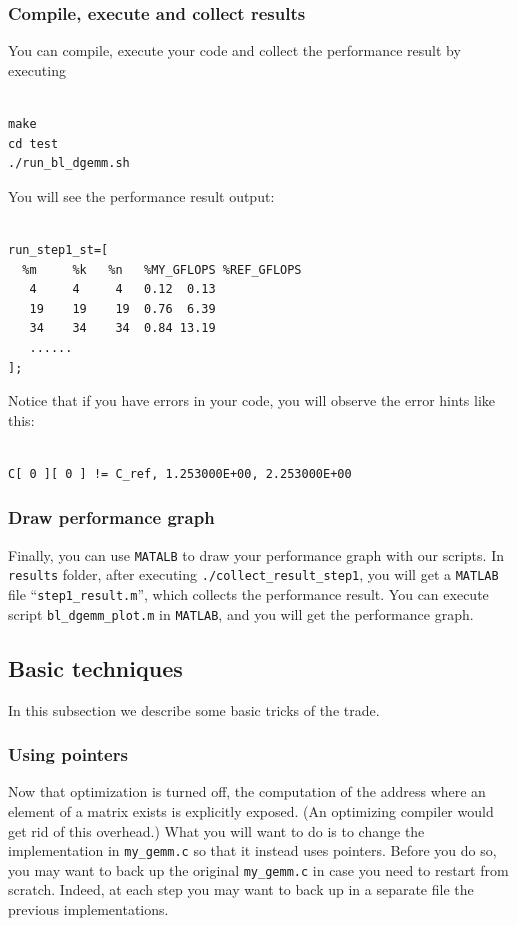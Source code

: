 \subsubsection{Compile, execute and collect results}
You can compile, execute your code and collect the performance result by executing
\begin{verbatim}

make
cd test
./run_bl_dgemm.sh

\end{verbatim}
You will see the performance result output:
\begin{verbatim}

run_step1_st=[
  %m     %k   %n   %MY_GFLOPS %REF_GFLOPS
   4     4     4   0.12  0.13
   19    19    19  0.76  6.39
   34    34    34  0.84 13.19
   ......
];

\end{verbatim}
Notice that if you have errors in your code, you will observe the error hints like this:
\begin{verbatim}

C[ 0 ][ 0 ] != C_ref, 1.253000E+00, 2.253000E+00

\end{verbatim}

\subsubsection{Draw performance graph}

Finally, you can use {\tt MATALB} to draw your performance graph with our scripts. In {\tt results} folder, after executing {\tt ./collect\_result\_step1}, you will get a {\tt MATLAB} file ``{\tt step1\_result.m}'', which collects the performance result. You can execute script {\tt bl\_dgemm\_plot.m} in {\tt MATLAB}, and you will get the performance graph. %

\subsection{Basic techniques}

In this subsection we describe some basic tricks of the trade.

\subsubsection{Using pointers}

Now that optimization is turned off, the computation of the address where an element of a matrix exists is explicitly exposed.  (An optimizing compiler would get rid of this overhead.)
What you will want to do is to change the implementation in {\tt my\_gemm.c} so that it instead uses pointers.
Before you do so, you may want to back up the original {\tt my\_gemm.c} in case you need to restart from scratch.  Indeed, at each step you may want to back up in a separate file the previous implementations.

